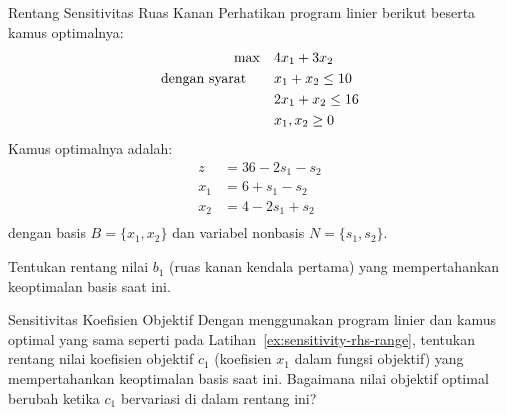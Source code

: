 \begin{ex}{Rentang Sensitivitas Ruas Kanan}{}
\label{ex:sensitivity-rhs-range}
 Perhatikan program linier berikut beserta kamus optimalnya:
\[
\begin{aligned}
\max \quad & 4x_1 + 3x_2 \\
\mbox{dengan syarat}\quad \quad
& x_1 + x_2 \leq 10 \\
& 2x_1 + x_2 \leq 16 \\
& x_1, x_2 \geq 0
\end{aligned}
\]
Kamus optimalnya adalah:
\[
\begin{aligned}
z &= 36 - 2s_1 - s_2 \\
x_1 &= 6 + s_1 - s_2 \\
x_2 &= 4 - 2s_1 + s_2 \\
\end{aligned}
\]
dengan basis $B = \{x_1, x_2\}$ dan variabel nonbasis $N = \{s_1, s_2\}$.

Tentukan rentang nilai $b_1$ (ruas kanan kendala pertama) yang mempertahankan keoptimalan basis saat ini.
\exrefs{\S\ref{sec:sensitivity-rhs}}
\end{ex}


\begin{ex}{Sensitivitas Koefisien Objektif}{}
 Dengan menggunakan program linier dan kamus optimal yang sama seperti pada Latihan~\ref{ex:sensitivity-rhs-range}, tentukan rentang nilai koefisien objektif $c_1$ (koefisien $x_1$ dalam fungsi objektif) yang mempertahankan keoptimalan basis saat ini. Bagaimana nilai objektif optimal berubah ketika $c_1$ bervariasi di dalam rentang ini?
\exrefs{\S\ref{sec:sensitivity-cost}}
\end{ex}

